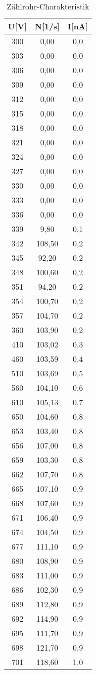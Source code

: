 \begin{table}[h]
	\begin{center}
		\begin{tabular}{ccc}
			U[V]&N[1/s]&I[nA] \\ \hline
			300&0,00&0,0\\
			303&0,00&0,0\\
			306&0,00&0,0\\
			309&0,00&0,0\\
			312&0,00&0,0\\
			315&0,00&0,0\\
			318&0,00&0,0\\
			321&0,00&0,0\\
			324&0,00&0,0\\
			327&0,00&0,0\\
			330&0,00&0,0\\
			333&0,00&0,0\\
			336&0,00&0,0\\
			339&9,80&0,1\\
			342&108,50&0,2\\
			345&92,20&0,2\\
			348&100,60&0,2\\
			351&94,20&0,2\\
			354&100,70&0,2\\
			357&104,70&0,2\\
			360&103,90&0,2\\
			410&103,02&0,3\\
			460&103,59&0,4\\
			510&103,69&0,5\\
			560&104,10&0,6\\
			610&105,13&0,7\\
			650&104,60&0,8\\
			653&103,40&0,8\\
			656&107,00&0,8\\
			659&103,30&0,8\\
			662&107,70&0,8\\
			665&107,10&0,9\\
			668&107,60&0,9\\
			671&106,40&0,9\\
			674&104,50&0,9\\
			677&111,10&0,9\\
			680&108,90&0,9\\
			683&111,00&0,9\\
			686&102,30&0,9\\
			689&112,80&0,9\\
			692&114,90&0,9\\
			695&111,70&0,9\\
			698&121,70&0,9\\
			701&118,60&1,0\\
		\end{tabular}
		\caption{Zählrohr-Charakteristik}
		\label{taba1}
	\end{center}
\end{table}